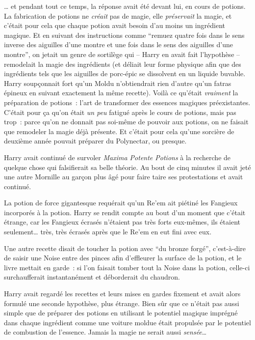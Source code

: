 … et pendant tout ce temps, la réponse avait été devant lui, en cours de potions. La fabrication de potions ne \emph{créait} pas de magie, elle \emph{préservait} la magie, et c'était pour cela que chaque potion avait besoin d'au moins un ingrédient magique. Et en suivant des instructions comme “remuez quatre fois dans le sens inverse des aiguilles d'une montre et une fois dans le sens des aiguilles d'une montre”, on jetait un genre de sortilège qui -- Harry en avait fait l'hypothèse -- remodelait la magie des ingrédients (et déliait leur forme physique afin que des ingrédients tels que les aiguilles de porc-épic se dissolvent en un liquide buvable. Harry soupçonnait fort qu'un Moldu n'obtiendrait rien d'autre qu'un fatras épineux en suivant exactement la même recette). Voilà ce qu'était \emph{vraiment} la préparation de potions~: l'art de transformer des essences magiques préexistantes. C'était pour ça qu'on était \emph{un peu} fatigué après le cours de potions, mais pas trop~: parce qu'on ne donnait pas soi-même de pouvoir aux potions, on ne faisait que remodeler la magie déjà présente. Et c'était pour cela qu'une sorcière de deuxième année pouvait préparer du Polynectar, ou presque.

Harry avait continué de survoler \emph{Maxima Potente Potions} à la recherche de quelque chose qui falsifierait sa belle théorie. Au bout de cinq minutes il avait jeté une autre Mornille au garçon plus âgé pour faire taire ses protestations et avait continué.

La potion de force gigantesque requérait qu'un Re'em ait piétiné les Fangieux incorporés à la potion. Harry se rendit compte au bout d'un moment que c'était étrange, car les Fangieux écrasés n'étaient pas très forts eux-mêmes, ils étaient seulement… très, très écrasés après que le Re'em en eut fini avec eux.

Une autre recette disait de toucher la potion avec “du bronze forgé”, c'est-à-dire de saisir une Noise entre des pinces afin d'effleurer la surface de la potion, et le livre mettait en garde~: si l'on faisait tomber tout la Noise dans la potion, celle-ci surchaufferait instantanément et déborderait du chaudron.

Harry avait regardé les recettes et leurs mises en gardes fixement et avait alors formulé une seconde hypothèse, plus étrange. Bien sûr que ce n'était pas aussi simple que de préparer des potions en utilisant le potentiel magique imprégné dans chaque ingrédient comme une voiture moldue était propulsée par le potentiel de combustion de l'essence. Jamais la magie ne serait aussi \emph{sensée}…

